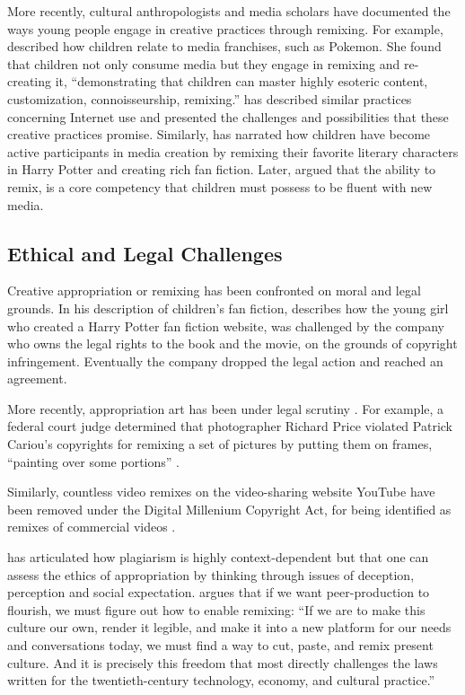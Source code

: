 More recently, cultural anthropologists and media scholars have documented the ways young people engage in creative practices through remixing. 
For example, \citet{ito_technologies_2007} described how children relate to media franchises, such as Pokemon.
She found that children not only consume media but they engage in remixing and re-creating it, ``demonstrating that children can master highly esoteric content, customization, connoisseurship, remixing.''
\citet{livingstone_taking_2008} has described similar practices concerning Internet use and presented the challenges and possibilities that these creative practices promise.
Similarly, \citet{jenkins_convergence_2006} has narrated how children have become active participants in media creation by remixing their favorite literary characters in Harry Potter and creating rich fan fiction.
Later, \citet{jenkins_confronting_2009} argued that the ability to remix, is a core competency that children must possess to be fluent with new media.

\subsection{Ethical and Legal Challenges}

Creative appropriation or remixing has been confronted on moral and legal grounds.
In his description of children's fan fiction, \citet{jenkins_convergence_2006} describes how the young girl who created a Harry Potter fan fiction website, was challenged by the company who owns the legal rights to the book and the movie, on the grounds of copyright infringement.
Eventually the company dropped the legal action and reached an agreement.

More recently, appropriation art has been under legal scrutiny \citep{greenberg_art_1992,landes_copyright_2000}. 
For example, a federal court judge determined that photographer Richard Price violated Patrick Cariou's copyrights for remixing a set of pictures by putting them on frames, ``painting over some portions'' \citep{batts_patrick_2011}.

Similarly, countless video remixes on the video-sharing website YouTube have been removed under the Digital Millenium Copyright Act, for being identified as remixes of commercial videos \citep{seneviratne_remix_2010}.

\citet{posner_little_2007} has articulated how plagiarism is highly context-dependent but that one can assess the ethics of appropriation by thinking through issues of deception, perception and social expectation.
\citet{benkler_wealth_2006} argues that if we want peer-production to flourish, we must figure out how to enable remixing:
``If we are to make this culture our own, render it legible, and make it into a new platform for our needs and conversations today, we must find a way to cut, paste, and remix present culture. And it is precisely this freedom that most directly challenges the laws written for the twentieth-century technology, economy, and cultural practice.''


